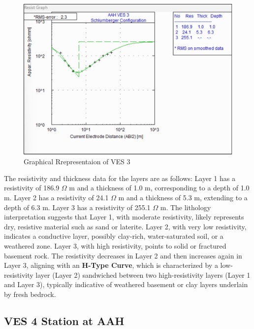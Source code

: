 \documentclass[12pt,a4paper]{report}
\begin{document}
\begin{figure}[H]
    \centering
    \includegraphics[width=1.0\textwidth]{aah_ves3.png}
    \caption{Graphical Rrepresentaion of VES 3}
    \label{fig:AAH_VES_3_Curve}
\end{figure}
The resistivity and thickness data for the layers are as follows: Layer 1 has a resistivity of 186.9 $\Omega$ m and a thickness of 1.0 m, corresponding to a depth of 1.0 m. Layer 2 has a resistivity of 24.1 $\Omega$ m and a thickness of 5.3 m, extending to a depth of 6.3 m. Layer 3 has a resistivity of 255.1 $\Omega$ m. The lithology interpretation suggests that Layer 1, with moderate resistivity, likely represents dry, resistive material such as sand or laterite. Layer 2, with very low resistivity, indicates a conductive layer, possibly clay-rich, water-saturated soil, or a weathered zone. Layer 3, with high resistivity, points to solid or fractured basement rock. The resistivity decreases in Layer 2 and then increases again in Layer 3, aligning with an \textbf{H-Type Curve}, which is characterized by a low-resistivity layer (Layer 2) sandwiched between two high-resistivity layers (Layer 1 and Layer 3), typically indicative of weathered basement or clay layers underlain by fresh bedrock.

\subsection{VES 4 Station at AAH}
\end{document}
